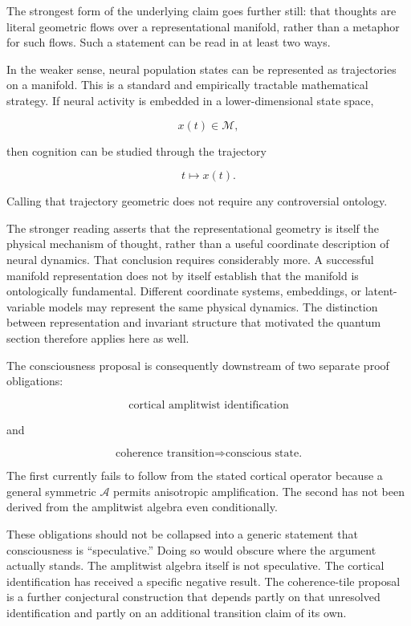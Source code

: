 \documentclass[11pt]{article}
\begin{document}
The strongest form of the underlying claim goes further still: that thoughts are literal geometric flows over a representational manifold, rather than a metaphor for such flows. Such a statement can be read in at least two ways.

In the weaker sense, neural population states can be represented as trajectories on a manifold. This is a standard and empirically tractable mathematical strategy. If neural activity is embedded in a lower-dimensional state space,

\begin{equation}
x(t)\in\mathcal M,
\end{equation}

then cognition can be studied through the trajectory

\begin{equation}
t\longmapsto x(t).
\end{equation}

Calling that trajectory geometric does not require any controversial ontology.

The stronger reading asserts that the representational geometry is itself the physical mechanism of thought, rather than a useful coordinate description of neural dynamics. That conclusion requires considerably more. A successful manifold representation does not by itself establish that the manifold is ontologically fundamental. Different coordinate systems, embeddings, or latent-variable models may represent the same physical dynamics. The distinction between representation and invariant structure that motivated the quantum section therefore applies here as well.

The consciousness proposal is consequently downstream of two separate proof obligations:

\begin{equation}
\boxed{
\text{cortical amplitwist identification}
}
\end{equation}

and

\begin{equation}
\boxed{
\text{coherence transition}
\Longrightarrow
\text{conscious state.}
}
\end{equation}

The first currently fails to follow from the stated cortical operator because a general symmetric $\mathcal A$ permits anisotropic amplification. The second has not been derived from the amplitwist algebra even conditionally.

These obligations should not be collapsed into a generic statement that consciousness is ``speculative.'' Doing so would obscure where the argument actually stands. The amplitwist algebra itself is not speculative. The cortical identification has received a specific negative result. The coherence-tile proposal is a further conjectural construction that depends partly on that unresolved identification and partly on an additional transition claim of its own.
\end{document}
